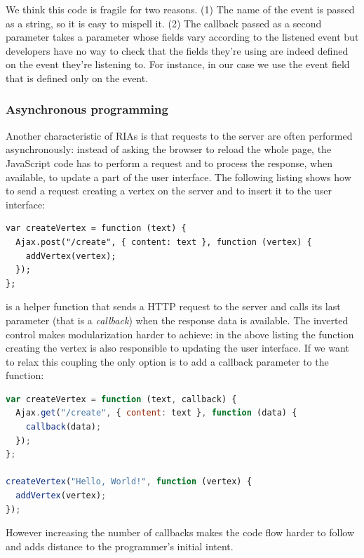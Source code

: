 \documentclass[american,english,runningheads]{llncs}
\begin{document}
We think this code is fragile for two reasons. (1) The name of the event is passed as a string, so it is easy to mispell it. (2) The callback passed as a second parameter takes a parameter  whose fields vary according to the listened event but developers have no way to check that the fields they’re using are indeed defined on the event they’re listening to. For instance, in our case we use the  event field that is defined only on the  event.

\subsubsection{Asynchronous programming}

Another characteristic of RIAs is that requests to the server are often performed asynchronously: instead of asking the browser to reload the whole page, the JavaScript code has to perform a request and to process the response, when available, to update a part of the user interface. The following listing shows how to send a request creating a vertex on the server and to insert it to the user interface:

\begin{lstlisting}
var createVertex = function (text) {
  Ajax.post("/create", { content: text }, function (vertex) {
    addVertex(vertex);
  });
};
\end{lstlisting}

 is a helper function that sends a HTTP request to the server and calls its last parameter (that is a \emph{callback}) when the response data is available. The inverted control makes modularization harder to achieve: in the above listing the function creating the vertex is also responsible to updating the user interface. If we want to relax this coupling the only option is to add a callback parameter to the  function:

\begin{lstlisting}[language=JavaScript,label=async-js,caption=Callback-driven JavaScript APIs]
var createVertex = function (text, callback) {
  Ajax.get("/create", { content: text }, function (data) {
    callback(data);
  });
};

createVertex("Hello, World!", function (vertex) {
  addVertex(vertex);
});
\end{lstlisting}

However increasing the number of callbacks makes the code flow harder to follow and adds distance to the programmer's initial intent.
\end{document}
